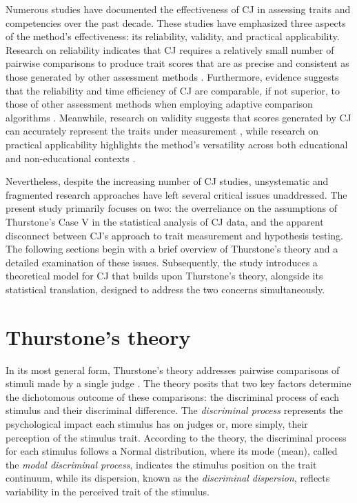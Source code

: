 \documentclass[
  authoryear,
  preprint,
  1p]{elsarticle}
\begin{document}
Numerous studies have documented the effectiveness of CJ in assessing
traits and competencies over the past decade. These studies have
emphasized three aspects of the method's effectiveness: its reliability,
validity, and practical applicability. Research on reliability indicates
that CJ requires a relatively small number of pairwise comparisons
\citep{Verhavert_et_al_2019, Crompvoets_et_al_2022} to produce trait
scores that are as precise and consistent as those generated by other
assessment methods
\citep{Coertjens_et_al_2017, Goossens_et_al_2018, Bouwer_et_al_2023}.
Furthermore, evidence suggests that the reliability and time efficiency
of CJ are comparable, if not superior, to those of other assessment
methods when employing adaptive comparison algorithms
\citep{Pollitt_2012b, Verhavert_et_al_2022, Mikhailiuk_et_al_2021}.
Meanwhile, research on validity suggests that scores generated by CJ can
accurately represent the traits under measurement
\citep{Whitehouse_2012, vanDaal_et_al_2016, Lesterhuis_2018_thesis, Bartholomew_et_al_2018, Bouwer_et_al_2023},
while research on practical applicability highlights the method's
versatility across both educational and non-educational contexts
\citep{Kimbell_2012, Jones_et_al_2015, Bartholomew_et_al_2018, Jones_et_al_2019, Marshall_et_al_2020, Bartholomew_et_al_2020, Boonen_et_al_2020}.

Nevertheless, despite the increasing number of CJ studies, unsystematic
and fragmented research approaches have left several critical issues
unaddressed. The present study primarily focuses on two: the
overreliance on the assumptions of Thurstone's Case V in the statistical
analysis of CJ data, and the apparent disconnect between CJ's approach
to trait measurement and hypothesis testing. The following sections
begin with a brief overview of Thurstone's theory and a detailed
examination of these issues. Subsequently, the study introduces a
theoretical model for CJ that builds upon Thurstone's theory, alongside
its statistical translation, designed to address the two concerns
simultaneously.

\section{Thurstone's theory}\label{sec-thurstone_theory}

In its most general form, Thurstone's theory addresses pairwise
comparisons of stimuli made by a single judge
\citep[pp.~267]{Thurstone_1927b}. The theory posits that two key factors
determine the dichotomous outcome of these comparisons: the discriminal
process of each stimulus and their discriminal difference. The
\emph{discriminal process} represents the psychological impact each
stimulus has on judges or, more simply, their perception of the stimulus
trait. According to the theory, the discriminal process for each
stimulus follows a Normal distribution, where its mode (mean), called
the \emph{modal discriminal process}, indicates the stimulus position on
the trait continuum, while its dispersion, known as the
\emph{discriminal dispersion}, reflects variability in the perceived
trait of the stimulus.
\end{document}
